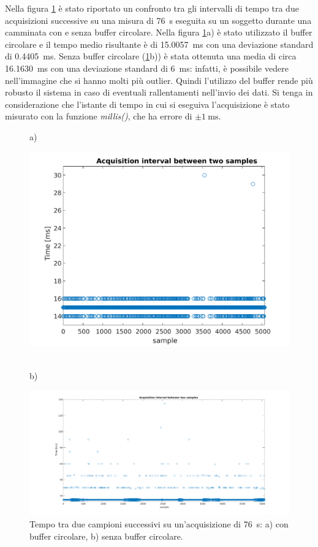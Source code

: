 \noindent
Nella figura \ref{fig:time_interval} è stato riportato un confronto tra gli intervalli di tempo tra due acquisizioni successive su una misura di \SI{76}{\second} eseguita su un soggetto durante una camminata con e senza buffer circolare. Nella figura \ref{fig:time_interval}a) è stato utilizzato il buffer circolare e il tempo medio risultante è di \SI{15.0057}{\milli\second} con una deviazione standard di \SI{0.4405}{\milli\second}. Senza buffer circolare (\Fig\ref{fig:time_interval}b)) è stata ottenuta una media di circa \SI{16.1630}{\milli\second} con una deviazione standard di \SI{6}{\milli\second}: infatti, è possibile vedere nell'immagine che si hanno molti più outlier. Quindi l'utilizzo del buffer rende più robusto il sistema in caso di eventuali rallentamenti nell'invio dei dati. Si tenga in considerazione che l'istante di tempo in cui si eseguiva l'acquisizione è stato misurato con la funzione \textit{millis()}, che ha errore di $\pm \SI{1}{\milli\second}$. 
\begin{figure}[tbh]
	\centering
	a)
	\begin{minipage}{.900\textwidth}
		\includegraphics[width=0.8\linewidth]{./ImageFiles/interval_time.pdf}
	\end{minipage}
	\\b)
	\begin{minipage}{.900\textwidth}
		\includegraphics[width=\linewidth]{./ImageFiles/interval_time_2}
	\end{minipage}
	\caption{Tempo tra due campioni successivi su un'acquisizione di \SI{76}{\second}: a) con buffer circolare, b) senza buffer circolare.}
	\label{fig:time_interval}
\end{figure}

